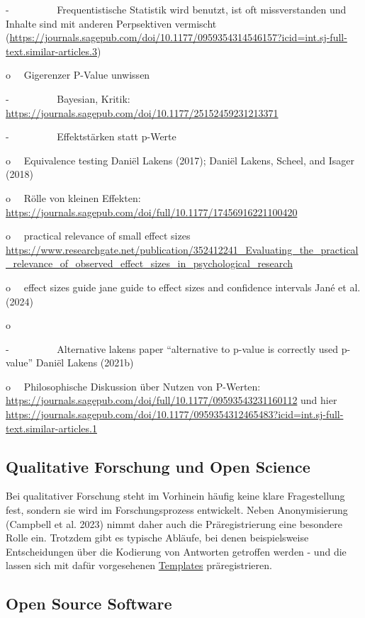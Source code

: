 \documentclass[
  letterpaper,
  DIV=11,
  numbers=noendperiod]{scrreprt}
\begin{document}
-~~~~~~~~~ Frequentistische Statistik wird benutzt, ist oft
missverstanden und Inhalte sind mit anderen Perpsektiven vermischt
(\url{https://journals.sagepub.com/doi/10.1177/0959354314546157?icid=int.sj-full-text.similar-articles.3})

o~~ Gigerenzer P-Value unwissen

-~~~~~~~~~ Bayesian, Kritik:
\url{https://journals.sagepub.com/doi/10.1177/25152459231213371}

-~~~~~~~~~ Effektstärken statt p-Werte

o~~ Equivalence testing Daniël Lakens (2017); Daniël Lakens, Scheel, and
Isager (2018)

o~~ Rölle von kleinen Effekten:
\url{https://journals.sagepub.com/doi/full/10.1177/17456916221100420}

o~~ practical relevance of small effect sizes
\url{https://www.researchgate.net/publication/352412241_Evaluating_the_practical_relevance_of_observed_effect_sizes_in_psychological_research}

o~~ effect sizes guide jane guide to effect sizes and confidence
intervals Jané et al. (2024)

o~~ ~

-~~~~~~~~~ Alternative lakens paper ``alternative to p-value is
correctly used p-value'' Daniël Lakens (2021b)

o~~ Philosophische Diskussion über Nutzen von P-Werten:
\url{https://journals.sagepub.com/doi/full/10.1177/09593543231160112}
und hier
\url{https://journals.sagepub.com/doi/10.1177/0959354312465483?icid=int.sj-full-text.similar-articles.1}

\subsection{Qualitative Forschung und Open
Science}\label{qualitative-forschung-und-open-science}

Bei qualitativer Forschung steht im Vorhinein häufig keine klare
Fragestellung fest, sondern sie wird im Forschungsprozess entwickelt.
Neben Anonymisierung (Campbell et al. 2023) nimmt daher auch die
Präregistrierung eine besondere Rolle ein. Trotzdem gibt es typische
Abläufe, bei denen beispielsweise Entscheidungen über die Kodierung von
Antworten getroffen werden - und die lassen sich mit dafür vorgesehenen
\href{https://docs.google.com/document/d/16vLoRAs6RmXKy0v1RCx6osSaYk4r64Hgl6S4_KtWbeM/edit\#heading=h.fwbi14d4b65g}{Templates}
präregistrieren.

\subsection{Open Source Software}\label{open-source-software}
\end{document}
